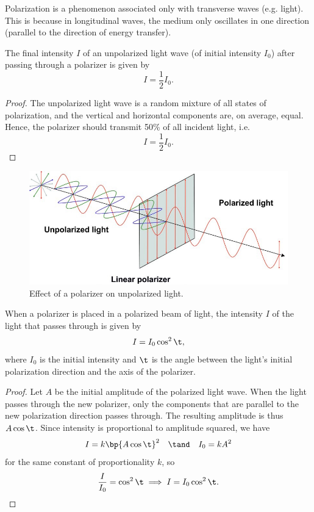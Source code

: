 Polarization is a phenomenon associated only with transverse waves (e.g. light). This is because in longitudinal waves, the medium only oscillates in one direction (parallel to the direction of energy transfer).

\begin{proposition}
    The final intensity $I$ of an unpolarized light wave (of initial intensity $I_0$) after passing through a polarizer is given by \[I = \frac12 I_0.\]
\end{proposition}
\begin{proof}
    The unpolarized light wave is a random mixture of all states of polarization, and the vertical and horizontal components are, on average, equal. Hence, the polarizer should transmit 50\% of all incident light, i.e. \[I = \frac12 I_0.\]
\end{proof}

\begin{figure}[H]
    \centering
    \includegraphics[scale=1.2]{media/Polarizer.jpg}
    \caption{Effect of a polarizer on unpolarized light.\protect\footnotemark}
\end{figure}

\begin{theorem}
    When a polarizer is placed in a polarized beam of light, the intensity $I$ of the light that passes through is given by \[I = I_0 \cos^2 \t,\] where $I_0$ is the initial intensity and $\t$ is the angle between the light's initial polarization direction and the axis of the polarizer.
\end{theorem}
\begin{proof}
    Let $A$ be the initial amplitude of the polarized light wave. When the light passes through the new polarizer, only the components that are parallel to the new polarization direction passes through. The resulting amplitude is thus $A \cos \t$. Since intensity is proportional to amplitude squared, we have \[I = k\bp{A \cos \t}^2 \quad \tand \quad I_0 = kA^2\] for the same constant of proportionality $k$, so \[\frac{I}{I_0} = \cos^2 \t \implies I = I_0 \cos^2 \t.\]
\end{proof}